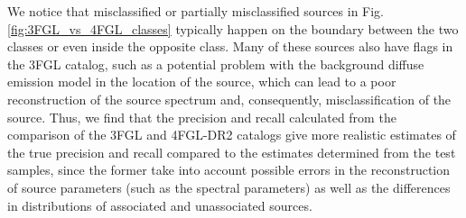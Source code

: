 \documentclass[referee]{aa} %
\newcommand{\dima}[1]{\textcolor{blue}{(Dima: #1)}}
\begin{document}
We notice that misclassified or partially misclassified sources in Fig. \ref{fig:3FGL_vs_4FGL_classes} typically happen on the boundary between the two classes or even inside the opposite class.
Many of these sources also have flags in the 3FGL catalog, such as a potential problem with the background diffuse emission model in the location of the source, which can lead to a poor reconstruction of the source spectrum and, consequently, misclassification of the source.
Thus, we find that the precision and recall calculated from the comparison of the 3FGL and 4FGL-DR2 catalogs give more realistic estimates
of the true precision and recall compared to the estimates determined from the test samples, since the former
take into account possible errors in the reconstruction of source parameters (such as the spectral parameters) as well as the differences in distributions of associated and unassociated sources.

%
\end{document}
